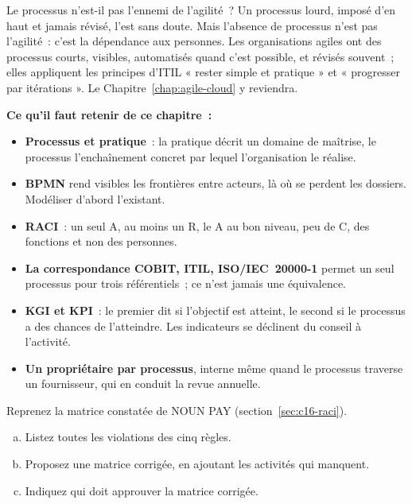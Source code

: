 \begin{boiteRemarque}{Le processus n'est-il pas l'ennemi de l'agilité~?}
Un processus lourd, imposé d'en haut et jamais révisé, l'est sans doute.
Mais l'absence de processus n'est pas l'agilité~: c'est la dépendance aux
personnes. Les organisations agiles ont des processus courts, visibles,
automatisés quand c'est possible, et révisés souvent~; elles appliquent les
principes d'ITIL « rester simple et pratique » et « progresser par
itérations ». Le Chapitre~\ref{chap:agile-cloud} y reviendra.
\end{boiteRemarque}

\separateur

\begin{boxresume}
\textbf{Ce qu'il faut retenir de ce chapitre~:}
\begin{itemize}
    \item \textbf{Processus et pratique}~: la pratique décrit un domaine de
          maîtrise, le processus l'enchaînement concret par lequel
          l'organisation le réalise.
    \item \textbf{BPMN} rend visibles les frontières entre acteurs, là où se
          perdent les dossiers. Modéliser d'abord l'existant.
    \item \textbf{RACI}~: un seul A, au moins un R, le A au bon niveau, peu
          de C, des fonctions et non des personnes.
    \item \textbf{La correspondance COBIT, ITIL, ISO/IEC~20000-1} permet un
          seul processus pour trois référentiels~; ce n'est jamais une
          équivalence.
    \item \textbf{KGI et KPI}~: le premier dit si l'objectif est atteint, le
          second si le processus a des chances de l'atteindre. Les
          indicateurs se déclinent du conseil à l'activité.
    \item \textbf{Un propriétaire par processus}, interne même quand le
          processus traverse un fournisseur, qui en conduit la revue
          annuelle.
\end{itemize}
\end{boxresume}

\bigskip

\begin{boxexo}[title={\ding{45}\quad Exercice~16.1. Corriger une matrice RACI \niveaubase}]
Reprenez la matrice constatée de NOUN PAY (section~\ref{sec:c16-raci}).
\begin{enumerate}[(a)]
    \item Listez toutes les violations des cinq règles.
    \item Proposez une matrice corrigée, en ajoutant les activités qui
          manquent.
    \item Indiquez qui doit approuver la matrice corrigée.
\end{enumerate}
\end{boxexo}

